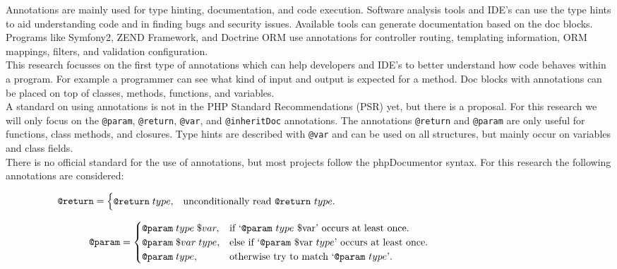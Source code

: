 \documentclass[../main.tex]{subfiles}
\begin{document}
    Annotations are mainly used for type hinting, documentation, and code execution.
    Software analysis tools and IDE's can use the type hints to aid understanding code and in finding bugs and security issues.
    Available tools can generate documentation based on the doc blocks.
    Programs like Symfony2, ZEND Framework, and Doctrine ORM use annotations for controller routing, templating information, ORM mappings, filters, and validation configuration.
    \\
    This research focusses on the first type of annotations which can help developers and IDE's to better understand how code behaves within a program.
    For example a programmer can see what kind of input and output is expected for a method.
    Doc blocks with annotations can be placed on top of classes, methods, functions, and variables.
    \\
    A standard on using annotations is not in the PHP Standard Recommendations (\gls{PSR}) yet, but there is a proposal\footnotemark.
    For this research we will only focus on the \texttt{@param}, \texttt{@return}, \texttt{@var}, and \texttt{@inheritDoc} annotations.
    The annotations \texttt{@return} and \texttt{@param} are only useful for functions, class methods, and closures.
    Type hints are described with \texttt{@var} and can be used on all structures, but mainly occur on variables and class fields.
    \\
    There is no official standard for the use of annotations, but most projects follow the phpDocumentor\footnotemark{} syntax.
    For this research the following annotations are considered:
    
\begin{equation}
  \begin{aligned}
  \texttt{@return}=\begin{cases}
    \texttt{@return} \; type, & \text{unconditionally read \texttt{@return} $type$}.\\
  \end{cases}
  \end{aligned}
  \phantom{\hspace{8cm}} %
\end{equation}

\begin{equation}
  \begin{aligned}
  \texttt{@param}=\begin{cases}
    \texttt{@param} \; type \; \$var, & \text{if `\texttt{@param} $type$ \$var' occurs at least once}.\\
    \texttt{@param} \; \$var \; type, & \text{else if `\texttt{@param} \$var $type$' occurs at least once}.\\
    \texttt{@param} \; type, & \text{otherwise try to match `\texttt{@param} $type$'}.\\
  \end{cases}
  \end{aligned}
  \phantom{\hspace{3.55cm}} %
\end{equation}
\end{document}

